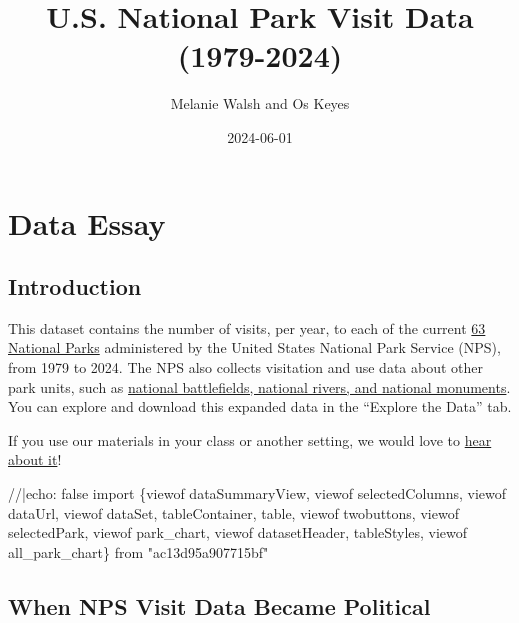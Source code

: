 \documentclass[
  letterpaper,
  DIV=11,
  numbers=noendperiod]{scrartcl}
\title{U.S. National Park Visit Data (1979-2024)}
\author{Melanie Walsh and Os Keyes}
\date{2024-06-01}
\newenvironment{Shaded}{\begin{snugshade}}{\end{snugshade}}
\newcommand{\NormalTok}[1]{\textcolor[rgb]{0.00,0.23,0.31}{#1}}
\begin{document}
\maketitle


\section{Data Essay}

\subsection{Introduction}\label{introduction}

This dataset contains the number of visits, per year, to each of the
current
\href{https://en.wikipedia.org/wiki/List_of_national_parks_of_the_United_States\#National_parks}{63
National Parks} administered by the United States National Park Service
(NPS), from 1979 to 2024. The NPS also collects visitation and use data
about other park units, such as
\href{(https://www.nps.gov/aboutus/national-park-system.htm)}{national
battlefields, national rivers, and national monuments}. You can explore
and download this expanded data in the ``Explore the Data'' tab.

\begin{tcolorbox}[enhanced jigsaw, arc=.35mm, opacitybacktitle=0.6, bottomrule=.15mm, left=2mm, toprule=.15mm, opacityback=0, colbacktitle=quarto-callout-tip-color!10!white, colback=white, breakable, titlerule=0mm, bottomtitle=1mm, toptitle=1mm, title={Brief Survey}, coltitle=black, rightrule=.15mm, leftrule=.75mm, colframe=quarto-callout-tip-color-frame]

If you use our materials in your class or another setting, we would love
to \href{https://forms.gle/yJpQscUH9k9Rn4Qy9}{hear about it}!

\end{tcolorbox}

\begin{Shaded}
\begin{Highlighting}[]
\NormalTok{//|echo: false}
\NormalTok{import \{viewof dataSummaryView, viewof selectedColumns, viewof dataUrl, viewof dataSet, tableContainer, table, viewof twobuttons, viewof selectedPark, viewof park\_chart, viewof datasetHeader, tableStyles, viewof all\_park\_chart\} from "ac13d95a907715bf"}
\end{Highlighting}
\end{Shaded}

\subsection{When NPS Visit Data Became
Political}\label{when-nps-visit-data-became-political}
\end{document}
